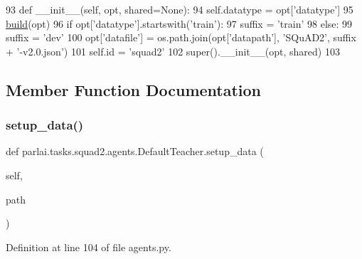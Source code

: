 \begin{DoxyCode}
93     \textcolor{keyword}{def }\_\_init\_\_(self, opt, shared=None):
94         self.datatype = opt[\textcolor{stringliteral}{'datatype'}]
95         \hyperlink{namespaceparlai_1_1mturk_1_1tasks_1_1talkthewalk_1_1download_a8c0fbb9b6dfe127cb8c1bd6e7c4e33fd}{build}(opt)
96         \textcolor{keywordflow}{if} opt[\textcolor{stringliteral}{'datatype'}].startswith(\textcolor{stringliteral}{'train'}):
97             suffix = \textcolor{stringliteral}{'train'}
98         \textcolor{keywordflow}{else}:
99             suffix = \textcolor{stringliteral}{'dev'}
100         opt[\textcolor{stringliteral}{'datafile'}] = os.path.join(opt[\textcolor{stringliteral}{'datapath'}], \textcolor{stringliteral}{'SQuAD2'}, suffix + \textcolor{stringliteral}{'-v2.0.json'})
101         self.id = \textcolor{stringliteral}{'squad2'}
102         super().\_\_init\_\_(opt, shared)
103 
\end{DoxyCode}


\subsection{Member Function Documentation}
\mbox{\label{classparlai_1_1tasks_1_1squad2_1_1agents_1_1DefaultTeacher_a68185506bbbcaadaee2dbf5162483437}} 
\subsubsection{\texorpdfstring{setup\+\_\+data()}{setup\_data()}}
{\footnotesize\ttfamily def parlai.\+tasks.\+squad2.\+agents.\+Default\+Teacher.\+setup\+\_\+data (\begin{DoxyParamCaption}\item[{}]{self,  }\item[{}]{path }\end{DoxyParamCaption})}



Definition at line 104 of file agents.\+py.


